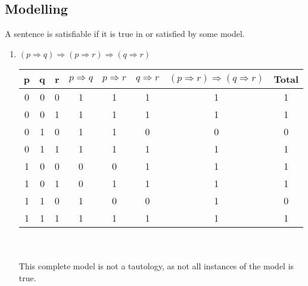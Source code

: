 \subsection{Modelling}
\begin{large}
  A sentence is satisfiable if it is true in or satisfied by some model.

  \begin{enumerate}[label=(\alph*)]
    \item $ (p \Rightarrow q) \Rightarrow (p \Rightarrow r) \Rightarrow ( q \Rightarrow r ) $

          \begin{tabular}{c|c|c|c|c|c|c||c}
            p & q & r & $ p \Rightarrow q $ & $ p \Rightarrow r $ & $ q \Rightarrow r $ & $ (p \Rightarrow r) \Rightarrow ( q \Rightarrow r ) $ & Total \\
            \hline \hline
            0 & 0 & 0 & 1                   & 1                   & 1                   & 1                                                     & 1     \\
            \hline
            0 & 0 & 1 & 1                   & 1                   & 1                   & 1                                                     & 1     \\
            \hline
            0 & 1 & 0 & 1                   & 1                   & 0                   & 0                                                     & 0     \\
            \hline
            0 & 1 & 1 & 1                   & 1                   & 1                   & 1                                                     & 1     \\
            \hline
            1 & 0 & 0 & 0                   & 0                   & 1                   & 1                                                     & 1     \\
            \hline
            1 & 0 & 1 & 0                   & 1                   & 1                   & 1                                                     & 1     \\
            \hline
            1 & 1 & 0 & 1                   & 0                   & 0                   & 1                                                     & 0     \\
            \hline
            1 & 1 & 1 & 1                   & 1                   & 1                   & 1                                                     & 1     \\
            \hline
          \end{tabular}
          \\ \\
          This complete model is not a tautology, as not all instances of the model is true.


\end{enumerate}
\end{large}
